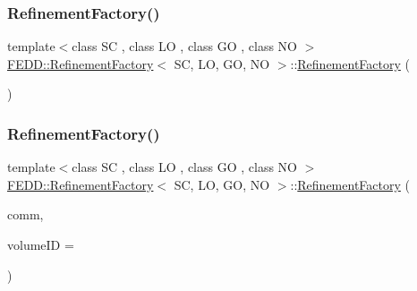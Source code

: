 \subsubsection{\texorpdfstring{Refinement\+Factory()}{RefinementFactory()}\hspace{0.1cm}{\footnotesize\ttfamily [1/3]}}
{\footnotesize\ttfamily template$<$class SC , class LO , class GO , class NO $>$ \\
\hyperlink{classFEDD_1_1RefinementFactory}{F\+E\+D\+D\+::\+Refinement\+Factory}$<$ SC, LO, GO, NO $>$\+::\hyperlink{classFEDD_1_1RefinementFactory}{Refinement\+Factory} (\begin{DoxyParamCaption}{ }\end{DoxyParamCaption})}

\mbox{\label{classFEDD_1_1RefinementFactory_a0815e8208b193e64c26e64d94691a967}} 
\subsubsection{\texorpdfstring{Refinement\+Factory()}{RefinementFactory()}\hspace{0.1cm}{\footnotesize\ttfamily [2/3]}}
{\footnotesize\ttfamily template$<$class SC , class LO , class GO , class NO $>$ \\
\hyperlink{classFEDD_1_1RefinementFactory}{F\+E\+D\+D\+::\+Refinement\+Factory}$<$ SC, LO, GO, NO $>$\+::\hyperlink{classFEDD_1_1RefinementFactory}{Refinement\+Factory} (\begin{DoxyParamCaption}\item[{\hyperlink{classFEDD_1_1RefinementFactory_a58381e0786c65ec61d11bc73c224b45a}{Comm\+Const\+Ptr\+\_\+\+Type}}]{comm,  }\item[{int}]{volume\+ID = {} }\end{DoxyParamCaption})}

\mbox{\label{classFEDD_1_1RefinementFactory_a0abc83a680e6002dab5ee53c16f5e4f1}} 
